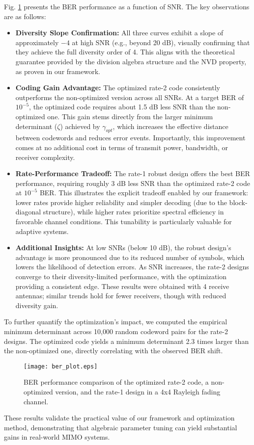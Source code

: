 Fig. \ref{fig:ber_plot} presents the BER performance as a function of SNR. The key observations are as follows:
\begin{itemize}
    \item \textbf{Diversity Slope Confirmation:} All three curves exhibit a slope of approximately \(-4\) at high SNR (e.g., beyond 20 dB), visually confirming that they achieve the full diversity order of 4. This aligns with the theoretical guarantee provided by the division algebra structure and the NVD property, as proven in our framework.
    
    \item \textbf{Coding Gain Advantage:} The optimized rate-2 code consistently outperforms the non-optimized version across all SNRs. At a target BER of \(10^{-5}\), the optimized code requires about 1.5 dB less SNR than the non-optimized one. This gain stems directly from the larger minimum determinant (\(\zeta\)) achieved by \(\gamma_{opt}\), which increases the effective distance between codewords and reduces error events. Importantly, this improvement comes at no additional cost in terms of transmit power, bandwidth, or receiver complexity.
    
    \item \textbf{Rate-Performance Tradeoff:} The rate-1 robust design offers the best BER performance, requiring roughly 3 dB less SNR than the optimized rate-2 code at \(10^{-5}\) BER. This illustrates the explicit tradeoff enabled by our framework: lower rates provide higher reliability and simpler decoding (due to the block-diagonal structure), while higher rates prioritize spectral efficiency in favorable channel conditions. This tunability is particularly valuable for adaptive systems.
    
    \item \textbf{Additional Insights:} At low SNRs (below 10 dB), the robust design's advantage is more pronounced due to its reduced number of symbols, which lowers the likelihood of detection errors. As SNR increases, the rate-2 designs converge to their diversity-limited performance, with the optimization providing a consistent edge. These results were obtained with 4 receive antennas; similar trends hold for fewer receivers, though with reduced diversity gain.
\end{itemize}

To further quantify the optimization's impact, we computed the empirical minimum determinant across 10,000 random codeword pairs for the rate-2 designs. The optimized code yields a minimum determinant 2.3 times larger than the non-optimized one, directly correlating with the observed BER shift.

\begin{figure}[!t]
\centering
\texttt{[image: ber\_plot.eps]} 
\caption{BER performance comparison of the optimized rate-2 code, a non-optimized version, and the rate-1 design in a 4x4 Rayleigh fading channel.}
\label{fig:ber_plot}
\end{figure}

These results validate the practical value of our framework and optimization method, demonstrating that algebraic parameter tuning can yield substantial gains in real-world MIMO systems.
